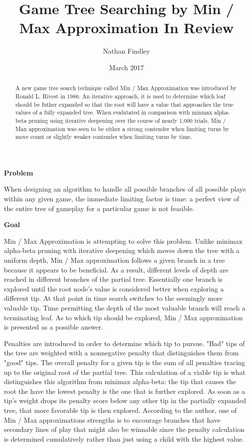 \documentclass[10pt, a4paper]{article}
\title{Game Tree Searching by Min / Max Approximation In Review}
\author{Nathan Findley}
\date{March 2017}
\begin{document}
\maketitle

\begin{abstract}

A new game tree search technique called Min / Max Approximation was introduced
by Ronald L. Rivest in 1986.  An iterative approach, it is used to determine
which leaf should be futher expanded so that the root will have a value that
approaches the true values of a fully expanded tree.  When evalutated in 
comparison with minmax alpha-beta pruning
using iterative deepening over the course of nearly 1,000 trials, Min / Max
approximation was seen to be either a strong contender when limiting turns by move count 
or slightly weaker contender when limiting turns by time.

\end{abstract}

\textbf{Problem} 

When designing an algorithm to handle all possible branches of all possible
plays within any given game, the immediate limiting factor is time: a perfect
view of the entire tree of gameplay for a particular game is not feasible.

\textbf{Goal} 

Min / Max Approximation is attempting to solve this problem.  Unlike minimax
alpha-beta pruning with iterative deepening which moves down the tree with a uniform depth, 
Min / Max approximation follows a
given branch in a tree because it appears to be beneficial.  As a result, different
levels of depth are reached in different branches of the partial tree.  Essentially one branch is explored
until the root node's value is considered better when exploring a different tip.
At that point in time search switches to the seemingly more valuable tip.  
Time permitting the depth of the most valuable branch will reach a terminating leaf.  As to which tip should 
be explored, Min / Max approximation is presented as a possible answer.

Penalties are introduced in order to determine which tip to pursue.  "Bad" tips of the tree
are weighted with a nonnegative penalty that distinguishes them from "good" tips.
The overall penalty for a given tip is the sum of all penalties tracing up to the original root of the partial tree.
This calculation of a viable tip is what distinguishes this algorithm from minimax alpha-beta: the tip that causes
the root the have the lowest penalty is the one that is further explored. As soon as a tip's
weight drops its penalty score below any other tip in the partially expanded
tree, that more favorable tip is then explored. According to the author, one of Min / Max approximations 
strengths is to encourage branches that have secondary lines of play that might also be
winnable since the penalty calculation is determined cumulatively rather than
just using a child with the highest value.
\end{document}
